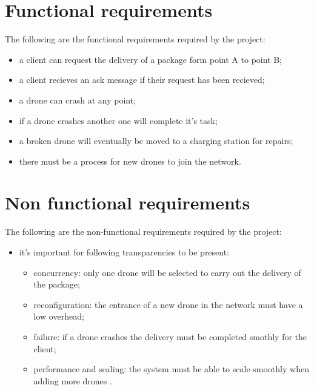 \documentclass[a4paper, oneside]{memoir}
\begin{document}
\section{Functional requirements}
The following are the functional requirements required by the project:
\begin{itemize}
\item a client can request the delivery of a package form point A to point B;
\item a client recieves an ack message if their request has been recieved;
\item a drone can crash at any point;
\item if a drone crashes another one will complete it's task;
\item a broken drone will eventually be moved to a charging station for repairs;
\item there must be a process for new drones to join the network.
\end{itemize}
 
\section{Non functional requirements}
The following are the non-functional requirements required by the project:
\begin{itemize}
\item it's important for following transparencies to be present:
	\begin{itemize}
	\item concurrency: only one drone will be selected to carry out the delivery of the package;
	\item reconfiguration: the entrance of a new drone in the network must have a low overhead;
	\item failure: if a drone crashes the delivery must be completed smothly for the client;
	\item performance and scaling: the system must be able to scale smoothly when adding more drones .
	\end{itemize}
\end{itemize}

\end{document}
